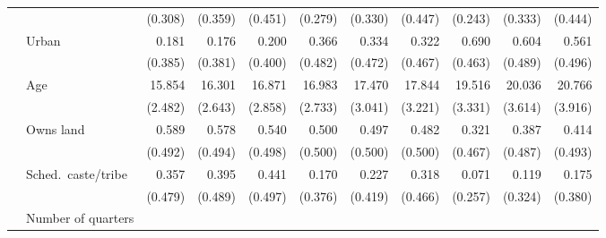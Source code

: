 \begin{table}[htp]
\begin{center}
\begin{scriptsize}
\begin{threeparttable}
\begin{tabular} {@{} c l D{.}{.}{1.3} D{.}{.}{1.3} D{.}{.}{1.3} D{.}{.}{1.3} D{.}{.}{1.3} D{.}{.}{1.3} D{.}{.}{1.3} D{.}{.}{1.3} D{.}{.}{1.3} @{}}
                    &                    &     (0.308)         &     (0.359)         &     (0.451)         &     (0.279)         &     (0.330)         &     (0.447)         &     (0.243)         &     (0.333)         &     (0.444)         \\
                    &Urban               &       0.181         &       0.176         &       0.200         &       0.366         &       0.334         &       0.322         &       0.690         &       0.604         &       0.561         \\
                    &                    &     (0.385)         &     (0.381)         &     (0.400)         &     (0.482)         &     (0.472)         &     (0.467)         &     (0.463)         &     (0.489)         &     (0.496)         \\
                    &Age                 &      15.854         &      16.301         &      16.871         &      16.983         &      17.470         &      17.844         &      19.516         &      20.036         &      20.766         \\
                    &                    &     (2.482)         &     (2.643)         &     (2.858)         &     (2.733)         &     (3.041)         &     (3.221)         &     (3.331)         &     (3.614)         &     (3.916)         \\
                    &Owns land           &       0.589         &       0.578         &       0.540         &       0.500         &       0.497         &       0.482         &       0.321         &       0.387         &       0.414         \\
                    &                    &     (0.492)         &     (0.494)         &     (0.498)         &     (0.500)         &     (0.500)         &     (0.500)         &     (0.467)         &     (0.487)         &     (0.493)         \\
                    &Sched.\ caste/tribe &       0.357         &       0.395         &       0.441         &       0.170         &       0.227         &       0.318         &       0.071         &       0.119         &       0.175         \\
                    &                    &     (0.479)         &     (0.489)         &     (0.497)         &     (0.376)         &     (0.419)         &     (0.466)         &     (0.257)         &     (0.324)         &     (0.380)         \\
                    &Number of quarters  &  &  &  &  &  &  &  &  &  \\

\end{tabular}
\end{threeparttable}
\end{scriptsize}
\end{center}
\end{table}
